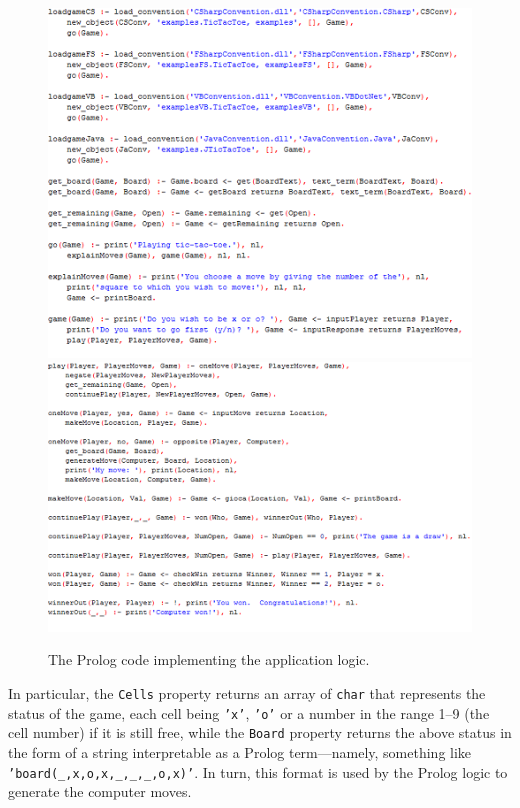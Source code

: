 \begin{figure}
   \centering
  \includegraphics[width=13cm]{images/dotnet-pipolo3}
  \includegraphics[width=13cm]{images/dotnet-pipolo4}
  \caption{The Prolog code implementing the application logic.}\label{fig:dotnet-pipolo34}
\end{figure}

\noindent In particular, the \texttt{Cells} property returns an array of \texttt{char} that represents the status of the game, each cell being  \texttt{'x'}, \texttt{'o'} or a number in the range 1--9 (the cell number) if it is still free, while the \texttt{Board} property returns the above status in the form of a string interpretable as a Prolog term---namely, something like \texttt{'board(\_,x,o,x,\_,\_,\_,o,x)'}.
In turn, this format is used by the Prolog logic to generate the computer moves.

